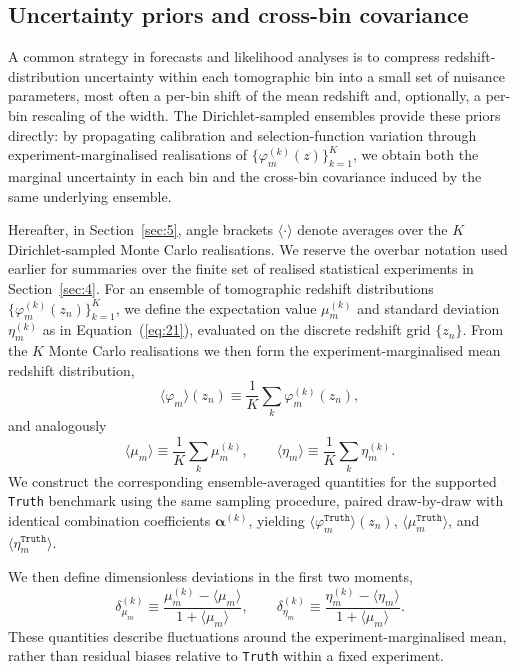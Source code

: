 \subsection{Uncertainty priors and cross-bin covariance} \label{sec:5.2}

A common strategy in forecasts and likelihood analyses is to compress redshift-distribution uncertainty within each tomographic bin into a small set of nuisance parameters, most often a per-bin shift of the mean redshift and, optionally, a per-bin rescaling of the width. The Dirichlet-sampled ensembles provide these priors directly: by propagating calibration and selection-function variation through experiment-marginalised realisations of \(\{\varphi_m^{(k)}(z)\}_{k=1}^{K}\), we obtain both the marginal uncertainty in each bin and the cross-bin covariance induced by the same underlying ensemble.

Hereafter, in Section~\ref{sec:5}, angle brackets \(\langle \cdot \rangle\) denote averages over the \(K\) Dirichlet-sampled Monte Carlo realisations. We reserve the overbar notation used earlier for summaries over the finite set of realised statistical experiments in Section~\ref{sec:4}. For an ensemble of tomographic redshift distributions \(\{\varphi^{(k)}_m(z_n)\}_{k=1}^{K}\), we define the expectation value \(\mu^{(k)}_m\) and standard deviation \(\eta^{(k)}_m\) as in Equation~(\ref{eq:21}), evaluated on the discrete redshift grid \(\{z_n\}\). From the \(K\) Monte Carlo realisations we then form the experiment-marginalised mean redshift distribution,
\begin{equation} \label{eq:28}
    \langle \varphi_m \rangle (z_n) \equiv \frac{1}{K}\sum_{k} \varphi^{(k)}_m(z_n),
\end{equation}
and analogously
\begin{equation} \label{eq:29}
    \langle \mu_m \rangle \equiv \frac{1}{K}\sum_{k} \mu^{(k)}_m, \qquad \langle \eta_m \rangle \equiv \frac{1}{K}\sum_{k} \eta^{(k)}_m.
\end{equation}
We construct the corresponding ensemble-averaged quantities for the supported \texttt{Truth} benchmark using the same sampling procedure, paired draw-by-draw with identical combination coefficients \(\boldsymbol{\alpha}^{(k)}\), yielding \(\langle \varphi^{\texttt{Truth}}_m \rangle (z_n)\), \(\langle \mu^{\texttt{Truth}}_m \rangle\), and \(\langle \eta^{\texttt{Truth}}_m \rangle\).

We then define dimensionless deviations in the first two moments,
\begin{equation} \label{eq:30}
    \delta^{(k)}_{\mu_m} \equiv \frac{\mu^{(k)}_m - \langle \mu_m \rangle}{1 + \langle \mu_m \rangle}, \qquad \delta^{(k)}_{\eta_m} \equiv \frac{\eta^{(k)}_m - \langle \eta_m \rangle}{1 + \langle \mu_m \rangle}.
\end{equation}
These quantities describe fluctuations around the experiment-marginalised mean, rather than residual biases relative to \texttt{Truth} within a fixed experiment.

